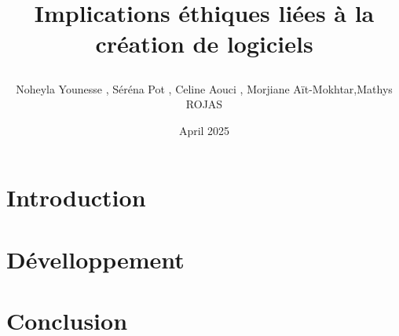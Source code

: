 \documentclass{article}
\title{Implications éthiques liées à la création de logiciels

}
\author{Noheyla Younesse , Séréna Pot , Celine Aouci , Morjiane Aït-Mokhtar,Mathys ROJAS}
\date{April 2025}
\begin{document}
\maketitle

\section{Introduction}

\section{Dévelloppement}

\section{Conclusion}
\end{document}
